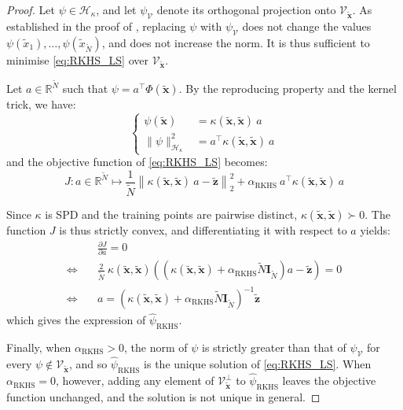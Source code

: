 \begin{proof}
	Let $\psi\in\mathcal{H}_\kappa$, and let $\psi_{\mathcal{V}}$ denote its orthogonal projection onto $\mathcal{V}_{\tilde{\mathbf{x}}}$. As established in the proof of , replacing $\psi$ with $\psi_{\mathcal{V}}$ does not change the values $\psi(\tilde{x}_1),\dots,\psi(\tilde{x}_{\tilde{N}})$, and does not increase the norm. It is thus sufficient to minimise \eqref{eq:RKHS_LS} over $\mathcal{V}_{\tilde{\mathbf{x}}}$.

	Let $a\in\mathbb{R}^{\tilde{N}}$ such that $\psi=a^\top\Phi(\tilde{\mathbf{x}})$. By the reproducing property and the kernel trick, we have:
	\begin{equation}
		\left\{\begin{aligned}
		\psi(\tilde{\mathbf{x}})&=\kappa(\tilde{\mathbf{x}},\tilde{\mathbf{x}})\:a\\
		\|\psi\|_{\mathcal{H}_\kappa}^2&=a^\top \kappa(\tilde{\mathbf{x}},\tilde{\mathbf{x}})\:a
		\end{aligned}\right.
	\end{equation}
	and the objective function of \eqref{eq:RKHS_LS} becomes:
	\begin{equation}
		J:a\in\mathbb{R}^{\tilde{N}}\mapsto\frac{1}{\tilde{N}}\left\|\kappa(\tilde{\mathbf{x}},\tilde{\mathbf{x}})\:a-\tilde{\mathbf{z}}\right\|_2^2+\alpha_{\mathrm{RKHS}}\:a^\top \kappa(\tilde{\mathbf{x}},\tilde{\mathbf{x}})\:a
	\end{equation}

	Since $\kappa$ is SPD and the training points are pairwise distinct, $\kappa(\tilde{\mathbf{x}},\tilde{\mathbf{x}})\succ0$. The function $J$ is thus strictly convex, and differentiating it with respect to $a$ yields:
	\begin{equation}
		\begin{aligned}
		&\frac{\partial J}{\partial a}=0\\
		\iff\quad&\frac{2}{\tilde{N}}\:\kappa(\tilde{\mathbf{x}},\tilde{\mathbf{x}})\left(\left(\kappa(\tilde{\mathbf{x}},\tilde{\mathbf{x}})+\alpha_{\mathrm{RKHS}}\tilde{N}\mathbf{I}_{\tilde{N}}\right)a-\tilde{\mathbf{z}}\right)=0\\
		\iff\quad&a=\left(\kappa(\tilde{\mathbf{x}},\tilde{\mathbf{x}})+\alpha_{\mathrm{RKHS}}\tilde{N}\mathbf{I}_{\tilde{N}}\right)^{-1}\tilde{\mathbf{z}}
		\end{aligned}
	\end{equation}
	which gives the expression of $\hat{\psi}_{\mathrm{RKHS}}$.

	Finally, when $\alpha_{\mathrm{RKHS}}>0$, the norm of $\psi$ is strictly greater than that of $\psi_{\mathcal{V}}$ for every $\psi\notin\mathcal{V}_{\tilde{\mathbf{x}}}$, and so $\hat{\psi}_{\mathrm{RKHS}}$ is the unique solution of \eqref{eq:RKHS_LS}. When $\alpha_{\mathrm{RKHS}}=0$, however, adding any element of $\mathcal{V}_{\tilde{\mathbf{x}}}^\perp$ to $\hat{\psi}_{\mathrm{RKHS}}$ leaves the objective function unchanged, and the solution is not unique in general.
\end{proof}


